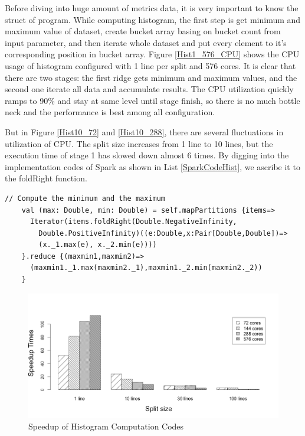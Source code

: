 Before diving into huge amount of metrics data, it is very important to know the struct of program. While computing histogram, the first step is get minimum and maximum value of dataset, create bucket array basing on bucket count from input parameter, and then iterate whole dataset and put every element to it's corresponding position in bucket array. Figure \ref{Hist1_576_CPU} shows the CPU usage of histogram configured with 1 line per split and 576 cores. It is clear that there are two stages: the first ridge gets minimum and maximum values, and the second one iterate all data and accumulate results. The CPU utilization quickly ramps to 90\% and stay at same level until stage finish, so there is no much bottle neck and the performance is best among all configuration.

But in Figure \ref{Hist10_72} and \ref{Hist10_288}, there are several fluctuations in utilization of CPU. The split size increases from 1 line to 10 lines, but the execution time of stage 1 has slowed down almost 6 times. By digging into the implementation codes of Spark as shown in List \ref{SparkCodeHist}, we ascribe it to the foldRight function. 

\lstset{language=Java,frame=single}
\begin{lstlisting}[float,caption= Codes Snippet of Histogram in Spark , label=SparkCodeHist]
    // Compute the minimum and the maximum
    val (max: Double, min: Double) = self.mapPartitions {items=>
      Iterator(items.foldRight(Double.NegativeInfinity,
        Double.PositiveInfinity)((e:Double,x:Pair[Double,Double])=>
        (x._1.max(e), x._2.min(e))))
    }.reduce {(maxmin1,maxmin2)=>
      (maxmin1._1.max(maxmin2._1),maxmin1._2.min(maxmin2._2))
    }
\end{lstlisting}


\begin{figure}[!ht]
\centering
\includegraphics[scale=.50]{figures/HistSpeedup.png}
\caption{Speedup of Histogram Computation Codes}
\label{HistSpeedup}
\end{figure}

